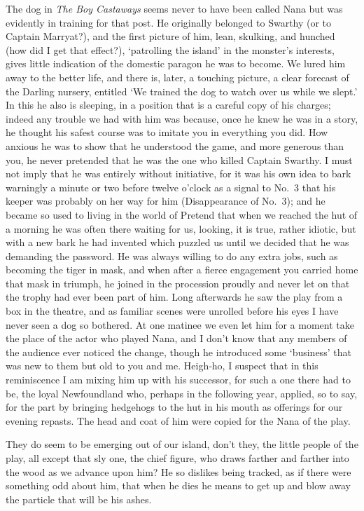 The dog in \emph{The Boy Castaways} seems never to have been called Nana
but was evidently in training for that post.
He originally belonged to Swarthy (or to Captain Marryat?),
and the first picture of him, lean, skulking, and hunched (how did I get that effect?),
‘patrolling the island’ in the monster’s interests,
gives little indication of the domestic paragon he was to become.
We lured him away to the better life,
and there is, later, a touching picture, a clear forecast of the Darling nursery,
entitled ‘We trained the dog to watch over us while we slept.’
In this he also is sleeping, in a position that is a careful copy of his charges;
indeed any trouble we had with him was because, once he knew he was in a story,
he thought his safest course was to imitate you in everything you did.
How anxious he was to show that he understood the game,
and more generous than you, he never pretended that he was the one who killed Captain Swarthy.
I must not imply that he was entirely without initiative,
for it was his own idea to bark warningly a minute or two before twelve o’clock
as a signal to No.~3 that his keeper was probably on her way for him (Disappearance of No.~3);
and he became so used to living in the world of Pretend
that when we reached the hut of a morning he was often there waiting for us,
looking, it is true, rather idiotic,
but with a new bark he had invented which puzzled us
until we decided that he was demanding the password.
He was always willing to do any extra jobs, such as becoming the tiger in mask,
and when after a fierce engagement you carried home that mask in triumph,
he joined in the procession proudly and never let on that the trophy had ever been part of him.
Long afterwards he saw the play from a box in the theatre,
and as familiar scenes were unrolled before his eyes I have never seen a dog so bothered.
At one matinee we even let him for a moment take the place of the actor who played Nana,
and I don’t know that any members of the audience ever noticed the change,
though he introduced some ‘business’ that was new to them but old to you and me.
Heigh‐ho, I suspect that in this reminiscence I am mixing him up with his successor,
for such a one there had to be,
the loyal Newfoundland who, perhaps in the following year, applied, so to say, for the part
by bringing hedgehogs to the hut in his mouth as offerings for our evening repasts.
The head and coat of him were copied for the Nana of the play.

They do seem to be emerging out of our island, don’t they,
the little people of the play,
all except that sly one, the chief figure,
who draws farther and farther into the wood as we advance upon him?
He so dislikes being tracked, as if there were something odd about him,
that when he dies he means to get up and blow away the particle that will be his ashes.

